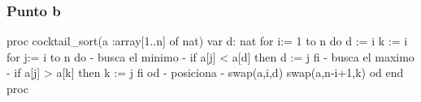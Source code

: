 \subsubsection{Punto b}
\begin{codebox}
\begin{pascallike}
proc cocktail_sort(a :array[1..n] of nat)
    var d: nat
    for i:= 1 to n do
        d := i
        k := i
        for j:= i to n do
            {- busca el minimo -}
            if a[j] < a[d] then
                d := j
            fi
            {- busca el maximo -}
            if a[j] > a[k] then
                k := j
            fi
        od
        {- posiciona -}
        swap(a,i,d)
        swap(a,n-i+1,k)
    od
end proc
\end{pascallike}
\end{codebox}